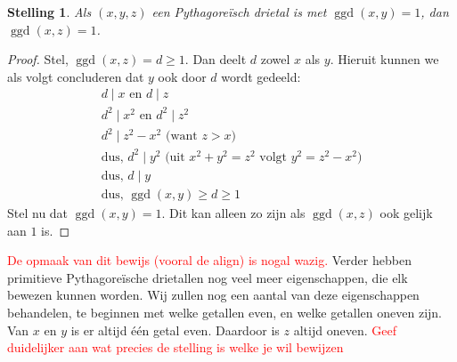 \documentclass[12pt,reqno]{article}
\theoremstyle{theorem}
\newtheorem{theorem}{Stelling}
\theoremstyle{definition}
\DeclareMathOperator{\ggd}{ggd}
\begin{document}
	\begin{theorem}
		Als $(x,y,z)$ een Pythagore\"isch drietal is met $\ggd(x,y) = 1$, dan $\ggd(x,z) = 1$.
	\end{theorem}
	\begin{proof}
		Stel, $\ggd(x,z) = d \geq 1$. Dan deelt $d$ zowel $x$ als $y$. Hieruit kunnen we als volgt concluderen dat $y$ ook door $d$ wordt gedeeld:
		\begin{align*}
			d\mid x \text{ en } d\mid z \\
			d^2\mid x^2 \text{ en } d^2 \mid z^2 \\
			d^2\mid z^2 - x^2 \text{ (want } z>x \text{)} \\
			\text{dus, } d^2 \mid y^2 \text{ (uit $x^2 + y^2 = z^2$ volgt $y^2 = z^2 - x^2$)} \\
			\text{dus, } d \mid y \\
			\text{dus, } \ggd(x, y) \geq d \geq 1
		\end{align*}
		Stel nu dat $\ggd(x, y) = 1$. Dit kan alleen zo zijn als $\ggd(x, z) $ ook gelijk aan $1$ is. 
	\end{proof}	
	\textcolor{red}{De opmaak van dit bewijs (vooral de align) is nogal wazig.}
	Verder hebben primitieve Pythagore\"ische drietallen nog veel meer eigenschappen, die elk bewezen kunnen worden. Wij zullen nog een aantal van deze eigenschappen behandelen, te beginnen met welke getallen even, en welke getallen oneven zijn. Van $x$ en $y$ is er altijd \'e\'en getal even. Daardoor is $z$ altijd oneven. \textcolor{red}{Geef duidelijker aan wat precies de stelling is welke je wil bewijzen}
\end{document}
